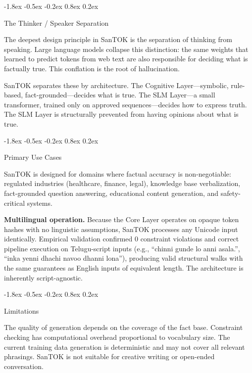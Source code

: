 \documentclass[10pt]{article}
\makeatletter
\renewcommand{\subsection}{\@startsection{subsection}{2}{\z@}%
  {-1.8ex \@plus -0.5ex \@minus -0.2ex}%
  {0.8ex \@plus 0.2ex}%
  {\normalsize\bfseries\raggedright}}
\makeatother
\begin{document}
\subsection{The Thinker / Speaker Separation}

The deepest design principle in SanTOK is the separation of thinking from speaking.
Large language models collapse this distinction: the same weights that learned to
predict tokens from web text are also responsible for deciding what is factually true.
This conflation is the root of hallucination.

SanTOK separates these by architecture. The Cognitive Layer---symbolic, rule-based,
fact-grounded---decides what is true. The SLM Layer---a small transformer, trained only
on approved sequences---decides how to express truth. The SLM Layer is structurally
prevented from having opinions about what is true.

\subsection{Primary Use Cases}

SanTOK is designed for domains where factual accuracy is non-negotiable: regulated
industries (healthcare, finance, legal), knowledge base verbalization, fact-grounded
question answering, educational content generation, and safety-critical systems.

\textbf{Multilingual operation.}
Because the Core Layer operates on opaque token hashes with no linguistic assumptions,
SanTOK processes any Unicode input identically. Empirical validation confirmed 0
constraint violations and correct pipeline execution on Telugu-script inputs
(e.g., ``chinni gunde lo anni asala.'', ``inka yenni dhachi navoo dhanni lona''),
producing valid structural walks with the same guarantees as English inputs of
equivalent length. The architecture is inherently script-agnostic.

\subsection{Limitations}

The quality of generation depends on the coverage of the fact base. Constraint
checking has computational overhead proportional to vocabulary size. The current
training data generation is deterministic and may not cover all relevant phrasings.
SanTOK is not suitable for creative writing or open-ended conversation.

\end{document}
